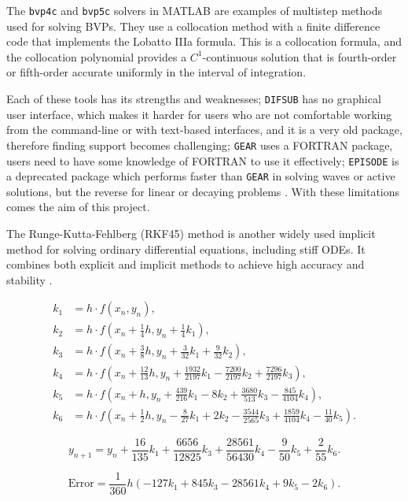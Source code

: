 The \texttt{bvp4c} and \texttt{bvp5c} solvers in MATLAB are examples of multistep methods used for solving BVPs. They use a collocation method with a finite difference code that implements the Lobatto IIIa formula. This is a collocation formula, and the collocation polynomial provides a $C^1$-continuous solution that is fourth-order or fifth-order accurate uniformly in the interval of integration.

Each of these tools has its strengths and weaknesses; \texttt{DIFSUB} has no graphical user interface, which makes it harder for users who are not comfortable working from the command-line or with text-based interfaces, and it is a very old package, therefore finding support becomes challenging; \texttt{GEAR} uses a FORTRAN package, users need to have some knowledge of FORTRAN to use it effectively; \texttt{EPISODE} is a deprecated package which performs faster than \texttt{GEAR} in solving waves or active solutions, but the reverse for linear or decaying problems \cite{BYRNE1977125}. With these limitations comes the aim of this project.

The Runge-Kutta-Fehlberg (RKF45) method is another widely used implicit method for solving ordinary differential equations, including stiff ODEs. It combines both explicit and implicit methods to achieve high accuracy and stability \cite{stone2017accelerating}.

\[
\begin{aligned}
  k_1 & = h \cdot f(x_n, y_n), \\
  k_2 & = h \cdot f\left(x_n + \frac{1}{4}h, y_n + \frac{1}{4}k_1\right), \\
  k_3 & = h \cdot f\left(x_n + \frac{3}{8}h, y_n + \frac{3}{32}k_1 + \frac{9}{32}k_2\right), \\
  k_4 & = h \cdot f\left(x_n + \frac{12}{13}h, y_n + \frac{1932}{2197}k_1 - \frac{7200}{2197}k_2 + \frac{7296}{2197}k_3\right), \\
  k_5 & = h \cdot f\left(x_n + h, y_n + \frac{439}{216}k_1 - 8k_2 + \frac{3680}{513}k_3 - \frac{845}{4104}k_4\right), \\
  k_6 & = h \cdot f\left(x_n + \frac{1}{2}h, y_n - \frac{8}{27}k_1 + 2k_2 - \frac{3544}{2565}k_3 + \frac{1859}{4104}k_4 - \frac{11}{40}k_5\right).
\end{aligned}
\]

\[
y_{n+1} = y_n + \frac{16}{135}k_1 + \frac{6656}{12825}k_3 + \frac{28561}{56430}k_4 - \frac{9}{50}k_5 + \frac{2}{55}k_6.
\]

\[
\text{Error} = \frac{1}{360}h(-127k_1 + 845k_3 - 28561k_4 + 9k_5 - 2k_6).
\]

